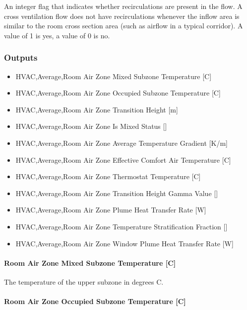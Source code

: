 An integer flag that indicates whether recirculations are present in the flow. A cross ventilation flow does not have recirculations whenever the inflow area is similar to the room cross section area (such as airflow in a typical corridor). A value of 1 is yes, a value of 0 is no.

\subsubsection{Outputs}\label{outputs-6-009}

\begin{itemize}
\item
  HVAC,Average,Room Air Zone Mixed Subzone Temperature {[}C{]}
\item
  HVAC,Average,Room Air Zone Occupied Subzone Temperature {[}C{]}
\item
  HVAC,Average,Room Air Zone Transition Height {[}m{]}
\item
  HVAC,Average,Room Air Zone Is Mixed Status {[]}
\item
  HVAC,Average,Room Air Zone Average Temperature Gradient {[}K/m{]}
\item
  HVAC,Average,Room Air Zone Effective Comfort Air Temperature {[}C{]}
\item
  HVAC,Average,Room Air Zone Thermostat Temperature {[}C{]}
\item
  HVAC,Average,Room Air Zone Transition Height Gamma Value {[]}
\item
  HVAC,Average,Room Air Zone Plume Heat Transfer Rate {[}W{]}
\item
  HVAC,Average,Room Air Zone Temperature Stratification Fraction {[]}
\item
  HVAC,Average,Room Air Zone Window Plume Heat Transfer Rate {[}W{]}
\end{itemize}

\paragraph{Room Air Zone Mixed Subzone Temperature {[}C{]}}\label{room-air-zone-mixed-subzone-temperature-c-1}

The temperature of the upper subzone in degrees C.

\paragraph{Room Air Zone Occupied Subzone Temperature {[}C{]}}\label{room-air-zone-occupied-subzone-temperature-c-1}

